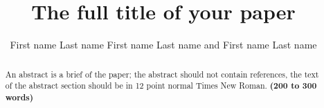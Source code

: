 \documentclass{aims}
\numberwithin{equation}{section}
\begin{document}
\title{The full title of your paper}

\author{%
  First name Last name
  First name Last name
  and
  First name Last name\corrauth
}


\address{%
  }


\begin{abstract}
An abstract is a brief of the paper; the abstract should not 
contain references, the text of the abstract section should be
in 12 point normal Times New Roman.
\textbf{(200 to 300 words)}
\end{abstract}


\maketitle
\end{document}
